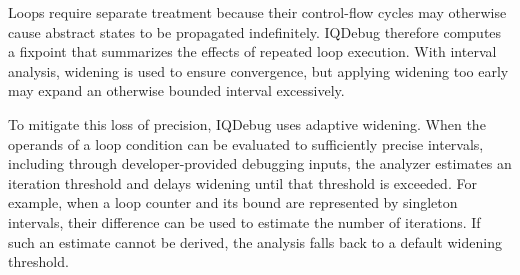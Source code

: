 \documentclass[11pt,oneside]{report}
\theoremstyle{plain}
\theoremstyle{definition}
\theoremstyle{remark}
\begin{document}
Loops require separate treatment because their control-flow cycles may otherwise cause abstract states to be propagated indefinitely.
IQDebug therefore computes a fixpoint that summarizes the effects of repeated loop execution.
With interval analysis, widening is used to ensure convergence, but applying widening too early may expand an otherwise bounded interval excessively.

To mitigate this loss of precision, IQDebug uses adaptive widening.
When the operands of a loop condition can be evaluated to sufficiently precise intervals, including through developer-provided debugging inputs, the analyzer estimates an iteration threshold and delays widening until that threshold is exceeded.
For example, when a loop counter and its bound are represented by singleton intervals, their difference can be used to estimate the number of iterations.
If such an estimate cannot be derived, the analysis falls back to a default widening threshold.
\end{document}
